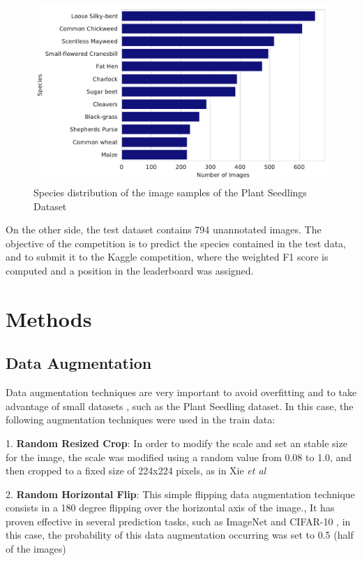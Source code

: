 \documentclass[10pt,onecolumn,titlepage,letterpaper]{article}
\begin{document}
\begin{figure}[h]
	\begin{center}
		\includegraphics[width=0.65\linewidth]{species_freq.pdf}
	\end{center}
	\caption{Species distribution of the image samples of the Plant Seedlings Dataset}
	\label{fig:distribution}
\end{figure}

On the other side, the test dataset contains 794 unannotated images. The objective of the competition is to predict the species contained in the test data, and to submit it to the Kaggle competition, where the weighted F1 score is computed and a position in the leaderboard was assigned.

\section{Methods}

\subsection{Data Augmentation}

Data augmentation techniques are very important to avoid overfitting and to take advantage of small datasets \cite{Shorten2019}, such as the Plant Seedling dataset. In this case, the following augmentation techniques were used in the train data:

1. \textbf{Random Resized Crop}: In order to modify the scale and set an stable size for the image, the scale was modified using a random value from 0.08 to 1.0, and then cropped to a fixed size of 224x224 pixels, as in Xie \textit{et al} \cite{Xie2017}

2. \textbf{Random Horizontal Flip}: This simple flipping data augmentation technique consists in a 180 degree flipping over the horizontal axis of the image., It has proven effective in several prediction tasks, such as ImageNet and CIFAR-10 \cite{Shorten2019}, in this case, the probability of this data augmentation occurring was set to 0.5 (half of the images)
\end{document}
